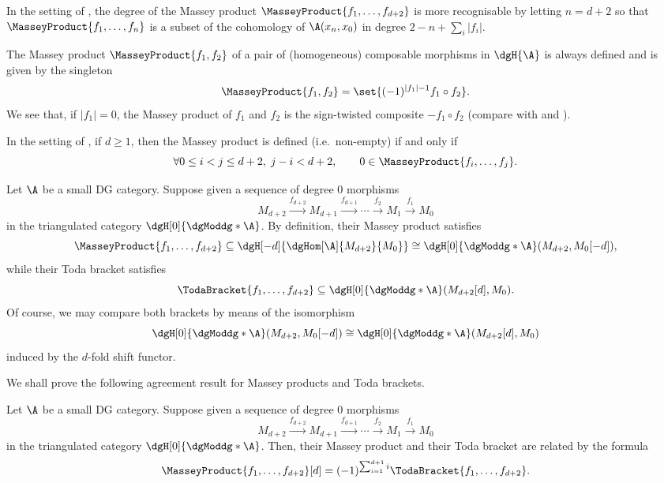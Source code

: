 \documentclass[a4paper]{amsart}
\begin{document}
\begin{remark}
  In the setting of , the degree of the Massey product
  $\MasseyProduct{f_1,\dots,f_{d+2}}$ is more recognisable by letting $n=d+2$ so
  that $\MasseyProduct{f_1,\dots,f_n}$ is a subset of the cohomology of
  $\A(x_n,x_0)$ in degree $2-n+\sum_i |f_i|$.
\end{remark}

\begin{remark}
  \label{rmk:MasseyProduct_d0}
  The Massey product $\MasseyProduct{f_1,f_2}$ of a pair of (homogeneous)
  composable morphisms in $\dgH{\A}$ is always defined and is given by the
  singleton
  \[
    \MasseyProduct{f_1,f_2}=\set{(-1)^{|f_1|-1}f_1\circ f_2}.
  \]
  We see that, if $|f_1|=0$, the Massey product of $f_1$ and $f_2$ is the
  sign-twisted composite $-f_1\circ f_2$ (compare with 
  and ).
\end{remark}

\begin{remark}
  \label{rmk:MasseyProduct_non-empty}
  In the setting of , if $d\geq1$, then the Massey
  product is defined (i.e.~non-empty) if and only if
  \[
    \forall 0\leq i<j\leq d+2,\; j-i<d+2,\qquad
    0\in\MasseyProduct{f_i,\dots,f_j}.
  \]
\end{remark}

\begin{remark}
  Let $\A$ be a small DG category. Suppose given a sequence of degree $0$
  morphisms
  \[
    M_{d+2}\xrightarrow{f_{d+2}}M_{d+1}\xrightarrow{f_{d+1}}\cdots\xrightarrow{f_2}M_1\xrightarrow{f_1}M_0
  \]
  in the triangulated category $\dgH[0]{\dgModdg*{\A}}$. By definition, their
  Massey product satisfies
  \[
    \MasseyProduct{f_1,\dots,f_{d+2}}\subseteq\dgH[-d]{\dgHom[\A]{M_{d+2}}{M_0}}\cong\dgH[0]{\dgModdg*{\A}}(M_{d+2},M_{0}[-d]),
  \]
  while their Toda bracket satisfies
  \[
    \TodaBracket{f_1,\dots,f_{d+2}}\subseteq\dgH[0]{\dgModdg*{\A}}(M_{d+2}[d],M_{0}).
  \]
  Of course, we may compare both brackets by means of the isomorphism
  \[
    \dgH[0]{\dgModdg*{\A}}(M_{d+2},M_{0}[-d])\cong\dgH[0]{\dgModdg*{\A}}(M_{d+2}[d],M_{0})
  \]
  induced by the $d$-fold shift functor.
\end{remark}

We shall prove the following agreement result for Massey products and Toda
brackets.

\begin{theorem}
  \label{thm:TodaMassey}
  Let $\A$ be a small DG category. Suppose given a sequence of degree $0$
  morphisms
  \[
    M_{d+2}\xrightarrow{f_{d+2}}M_{d+1}\xrightarrow{f_{d+1}}\cdots\xrightarrow{f_2}M_1\xrightarrow{f_1}M_0
  \]
  in the triangulated category $\dgH[0]{\dgModdg*{\A}}$. Then, their Massey
  product and their Toda bracket are related by the formula
  \[
    \MasseyProduct{f_1,\dots,f_{d+2}}[d]=(-1)^{\sum_{i=1}^{d+1}
      i}\TodaBracket{f_1,\dots,f_{d+2}}.
  \]
\end{theorem}
\end{document}
